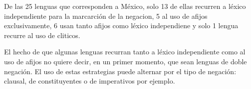 \noindent De las 25 lenguas que corresponden a México, solo 13 de ellas recurren a léxico independiente para la marcarción de la negacion, 5 al uso de afijos exclusivamente, 6 usan tanto afijos como léxico independiene y solo 1 lengua recurre al uso de cliticos.

El hecho de que algunas lenguas recurran tanto a léxico independiente como al uso de afijos no quiere decir, en un primer momento, que sean lenguas de doble negación. El uso de estas estrategias puede alternar por el tipo de negación: clausal, de constituyentes o de imperativos por ejemplo.

